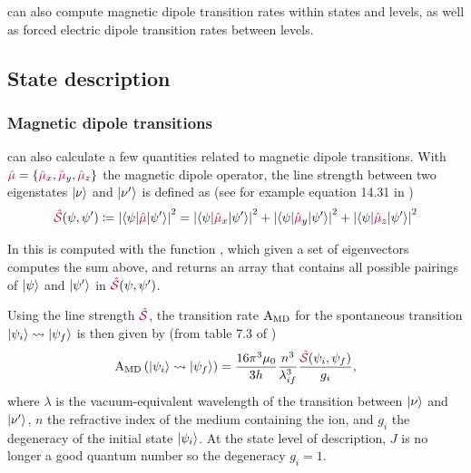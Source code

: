 \documentclass[11pt, twoside,openright]{article}
\begin{document}
\qlanth can also compute magnetic dipole transition rates within states and levels, as well as forced electric dipole transition rates between levels.

\subsection{State description}

\subsubsection{Magnetic dipole transitions}

\qlanth can also calculate a few quantities related to magnetic dipole transitions. With $\textcolor{purple}{\hat{\mu}} = \{\textcolor{purple}{\hat{\mu}}_x, \textcolor{purple}{\hat{\mu}}_y, \textcolor{purple}{\hat{\mu}}_z\}$ the magnetic dipole operator, the line strength between two eigenstates $|\nu\rangle$ and $|\nu'\rangle$ is defined as (see for example equation 14.31 in \cite{cowan_theory_1981})
\begin{equation}
	\textcolor{purple}{\hat{\mathcal{S}}}(\psi,\psi') \coloneqq \left| \langle \psi|\textcolor{purple}{\hat{\mu}}|\psi'\rangle \right|^2 = \left| \langle \psi|\textcolor{purple}{\hat{\mu}}_x|\psi'\rangle \right|^2 + \left| \langle \psi|\textcolor{purple}{\hat{\mu}}_y|\psi'\rangle \right|^2 + \left| \langle \psi|\textcolor{purple}{\hat{\mu}}_z|\psi'\rangle \right|^2
\end{equation}

In \qlanth this is computed with the function , which given a set of eigenvectors computes the sum above, and returns an array that contains all possible pairings of $|\psi\rangle$ and $|\psi'\rangle$ in $\textcolor{purple}{\hat{\mathcal{S}}}(\psi,\psi')$.
 


Using the line strength $\textcolor{purple}{\hat{\mathcal{S}}}$, the transition rate $\text{A}_\text{MD}$ for the spontaneous transition $|\psi_i\rangle \rightsquigarrow |\psi_f\rangle$ is then given by (from table 7.3 of \cite{thorne_spectrophysics_1999})
\begin{equation}
	\text{A}_\text{MD}\left(|\psi_i\rangle \rightsquigarrow |\psi_f\rangle\right) = \frac{16 \pi^3 \mu_0}{3 h} \frac{n^3}{\lambda_{if}^3} \frac{\textcolor{purple}{\hat{\mathcal{S}}}(\psi_i,\psi_f)}{g_i},
\end{equation}
where $\lambda$ is the vacuum-equivalent wavelength of the transition between $|\nu\rangle$ and $|\nu'\rangle$, $n$ the refractive index of the medium containing the ion, and $g_i$ the degeneracy of the initial state $|\psi_i\rangle$. At the state level of description, $J$ is no longer a good quantum number so the degeneracy $g_i=1$. 
\end{document}
